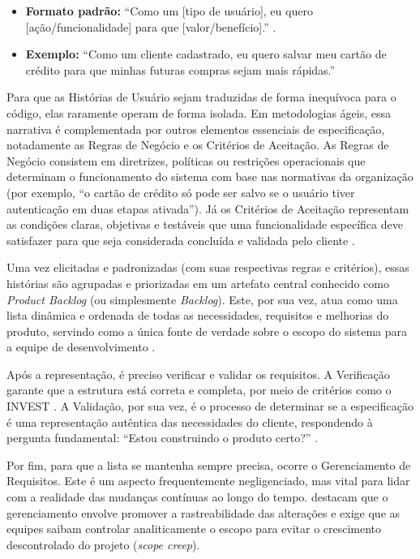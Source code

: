 \begin{itemize}
    \item \textbf{Formato padrão:} ``Como um [tipo de usuário], eu quero [ação/funcionalidade] para que [valor/benefício].'' \cite{cohn2004}.
    \item \textbf{Exemplo:} ``Como um cliente cadastrado, eu quero salvar meu cartão de crédito para que minhas futuras compras sejam mais rápidas.''
\end{itemize}

Para que as Histórias de Usuário sejam traduzidas de forma inequívoca para o código, elas raramente operam de forma isolada. Em metodologias ágeis, essa narrativa é complementada por outros elementos essenciais de especificação, notadamente as Regras de Negócio e os Critérios de Aceitação. As Regras de Negócio consistem em diretrizes, políticas ou restrições operacionais que determinam o funcionamento do sistema com base nas normativas da organização (por exemplo, ``o cartão de crédito só pode ser salvo se o usuário tiver autenticação em duas etapas ativada''). Já os Critérios de Aceitação representam as condições claras, objetivas e testáveis que uma funcionalidade específica deve satisfazer para que seja considerada concluída e validada pelo cliente \cite{scrumstudy2024}.

Uma vez elicitadas e padronizadas (com suas respectivas regras e critérios), essas histórias são agrupadas e priorizadas em um artefato central conhecido como \textit{Product Backlog} (ou simplesmente \textit{Backlog}). Este, por sua vez, atua como uma lista dinâmica e ordenada de todas as necessidades, requisitos e melhorias do produto, servindo como a única fonte de verdade sobre o escopo do sistema para a equipe de desenvolvimento \cite{scrumstudy2024}.

Após a representação, é preciso verificar e validar os requisitos. A Verificação garante que a estrutura está correta e completa, por meio de critérios como o INVEST \cite{buglione2013}. A Validação, por sua vez, é o processo de determinar se a especificação é uma representação autêntica das necessidades do cliente, respondendo à pergunta fundamental: ``Estou construindo o produto certo?'' \cite{laplante2022}.

Por fim, para que a lista se mantenha sempre precisa, ocorre o Gerenciamento de Requisitos. Este é um aspecto frequentemente negligenciado, mas vital para lidar com a realidade das mudanças contínuas ao longo do tempo.  destacam que o gerenciamento envolve promover a rastreabilidade das alterações e exige que as equipes saibam controlar analiticamente o escopo para evitar o crescimento descontrolado do projeto (\textit{scope creep}).

